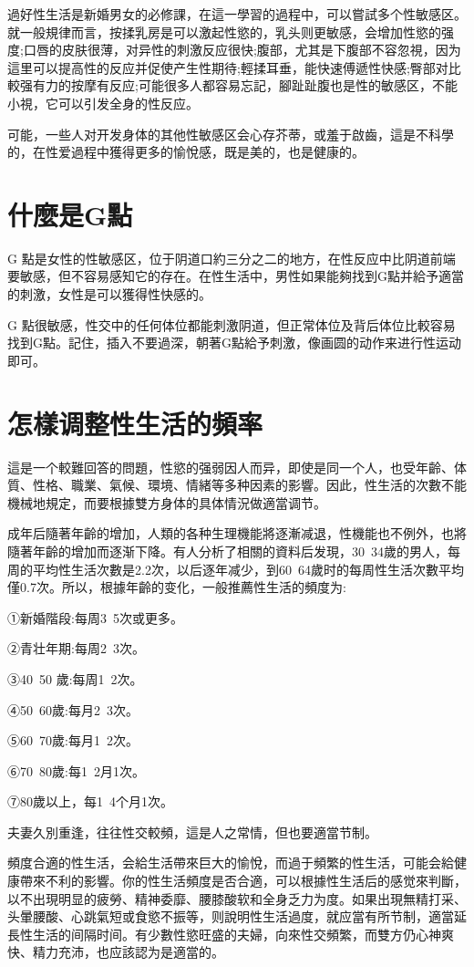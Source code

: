 \documentclass[12pt,UTF8]{ctexbook}
\begin{document}
過好性生活是新婚男女的必修課，在這一學習的過程中，可以嘗試多个性敏感区。就一般規律而言，按揉乳房是可以激起性慾的，乳头则更敏感，会增加性慾的强度;口唇的皮肤很薄，对异性的刺激反应很快;腹部，尤其是下腹部不容忽視，因为這里可以提高性的反应并促使产生性期待;輕揉耳垂，能快速傅遞性快感;臀部对比較强有力的按摩有反应;可能很多人都容易忘記，腳趾趾腹也是性的敏感区，不能小視，它可以引发全身的性反应。

可能，一些人对开发身体的其他性敏感区会心存芥蒂，或羞于啟齒，這是不科學的，在性爱過程中獲得更多的愉悅感，既是美的，也是健康的。

\section{什麼是G點}

G 點是女性的性敏感区，位于阴道口約三分之二的地方，在性反应中比阴道前端要敏感，但不容易感知它的存在。在性生活中，男性如果能夠找到G點并給予適當的刺激，女性是可以獲得性快感的。

G 點很敏感，性交中的任何体位都能刺激阴道，但正常体位及背后体位比較容易找到G點。記住，插入不要過深，朝著G點給予刺激，像画圆的动作来进行性运动即可。

\section{怎樣调整性生活的頻率}

這是一个較難回答的問題，性慾的强弱因人而异，即使是同一个人，也受年齡、体質、性格、職業、氣候、環境、情緒等多种因素的影響。因此，性生活的次數不能機械地規定，而要根據雙方身体的具体情況做適當调节。

成年后隨著年齡的增加，人類的各种生理機能將逐漸减退，性機能也不例外，也將隨著年齡的增加而逐渐下降。有人分析了相關的資料后发現，30~34歲的男人，每周的平均性生活次數是2.2次，以后逐年减少，到60~64歲时的每周性生活次數平均僅0.7次。所以，根據年齡的变化，一般推薦性生活的頻度为:

①新婚階段:每周3~5次或更多。

②青壮年期:每周2~3次。

③40~50 歲:每周1~2次。

④50~60歲:每月2~3次。

⑤60~70歲:每月1~2次。

⑥70~80歲:每1~2月1次。

⑦80歲以上，每1~4个月1次。

夫妻久別重逢，往往性交較頻，這是人之常情，但也要適當节制。

頻度合適的性生活，会給生活帶來巨大的愉悅，而過于頻繁的性生活，可能会給健康帶來不利的影響。你的性生活頻度是否合適，可以根據性生活后的感觉來判斷，以不出現明显的疲勞、精神委靡、腰膝酸软和全身乏力为度。如果出現無精打采、头暈腰酸、心跳氣短或食慾不振等，则說明性生活過度，就应當有所节制，適當延長性生活的间隔时间。有少數性慾旺盛的夫婦，向來性交頻繁，而雙方仍心神爽快、精力充沛，也应該認为是適當的。
\end{document}
